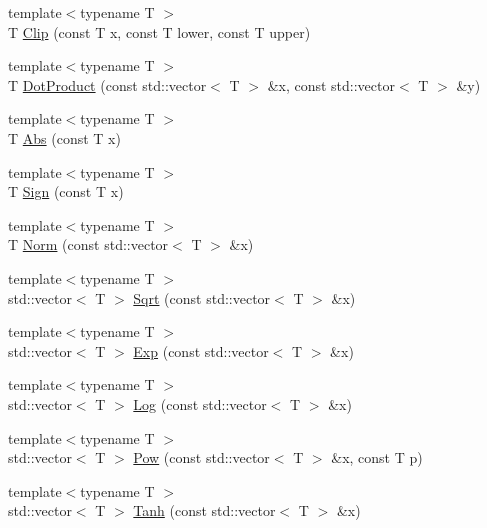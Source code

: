 \begin{DoxyCompactItemize}
\item 
{\footnotesize template$<$typename T $>$ }\\T \hyperlink{contrafold_2_utilities_8ipp_a320ef704643929c4107b9cf524fbef6c}{Clip} (const T x, const T lower, const T upper)
\item 
{\footnotesize template$<$typename T $>$ }\\T \hyperlink{contrafold_2_utilities_8ipp_a4bb1be5baf8e6b84d08b0d3a6f19ec60}{Dot\+Product} (const std\+::vector$<$ T $>$ \&x, const std\+::vector$<$ T $>$ \&y)
\item 
{\footnotesize template$<$typename T $>$ }\\T \hyperlink{contrafold_2_utilities_8ipp_afaa054e15f31737d6061c62a24c9ad54}{Abs} (const T x)
\item 
{\footnotesize template$<$typename T $>$ }\\T \hyperlink{contrafold_2_utilities_8ipp_a797eeaa74fbdca4a7644e4c0f306f1dc}{Sign} (const T x)
\item 
{\footnotesize template$<$typename T $>$ }\\T \hyperlink{contrafold_2_utilities_8ipp_a84154107c2a94a052bf6e096e947746c}{Norm} (const std\+::vector$<$ T $>$ \&x)
\item 
{\footnotesize template$<$typename T $>$ }\\std\+::vector$<$ T $>$ \hyperlink{contrafold_2_utilities_8ipp_af7c1cc7b0896db3c539b96deb7180fa6}{Sqrt} (const std\+::vector$<$ T $>$ \&x)
\item 
{\footnotesize template$<$typename T $>$ }\\std\+::vector$<$ T $>$ \hyperlink{contrafold_2_utilities_8ipp_abc9676247707551f952b0fa97656939b}{Exp} (const std\+::vector$<$ T $>$ \&x)
\item 
{\footnotesize template$<$typename T $>$ }\\std\+::vector$<$ T $>$ \hyperlink{contrafold_2_utilities_8ipp_a466966e2539438481f776b9439ba9f78}{Log} (const std\+::vector$<$ T $>$ \&x)
\item 
{\footnotesize template$<$typename T $>$ }\\std\+::vector$<$ T $>$ \hyperlink{contrafold_2_utilities_8ipp_af855c94a7de5278e38bcdb7f92a5c269}{Pow} (const std\+::vector$<$ T $>$ \&x, const T p)
\item 
{\footnotesize template$<$typename T $>$ }\\std\+::vector$<$ T $>$ \hyperlink{contrafold_2_utilities_8ipp_a06f06e0b783488133ecf5ec215364c5e}{Tanh} (const std\+::vector$<$ T $>$ \&x)
\item 

\end{DoxyCompactItemize}
